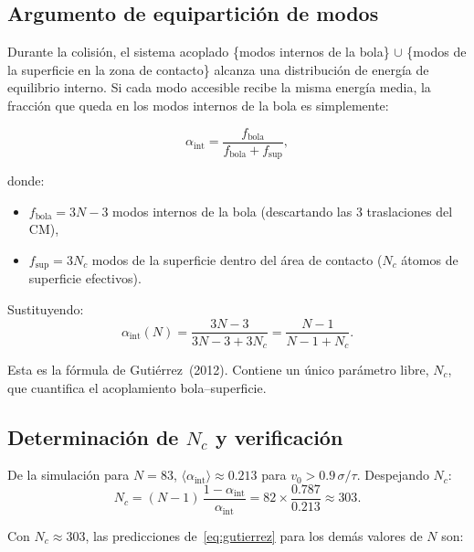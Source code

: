 \documentclass[11pt, a4paper]{article}
\begin{document}
\subsection{Argumento de equipartición de modos}

Durante la colisión, el sistema acoplado \{modos internos de la bola\} $\cup$
\{modos de la superficie en la zona de contacto\} alcanza una distribución de
energía de equilibrio interno. Si cada modo accesible recibe la misma energía
media, la fracción que queda en los modos internos de la bola es simplemente:

\begin{equation}
  \alpha_\text{int} = \frac{f_\text{bola}}{f_\text{bola} + f_\text{sup}},
\end{equation}

donde:
\begin{itemize}
  \item $f_\text{bola} = 3N - 3$ modos internos de la bola
        (descartando las 3 traslaciones del CM),
  \item $f_\text{sup} = 3N_c$ modos de la superficie dentro del área de contacto
        ($N_c$ átomos de superficie efectivos).
\end{itemize}

Sustituyendo:
\begin{equation}
  \boxed{\alpha_\text{int}(N) = \frac{3N - 3}{3N - 3 + 3N_c}
  = \frac{N - 1}{N - 1 + N_c}.}
  \label{eq:gutierrez}
\end{equation}

Esta es la fórmula de Gutiérrez~(2012). Contiene un único parámetro libre,
$N_c$, que cuantifica el acoplamiento bola--superficie.

\subsection{Determinación de \texorpdfstring{$N_c$}{Nc} y verificación}

De la simulación para $N=83$, $\langle\alpha_\text{int}\rangle \approx 0.213$
para $v_0 > 0.9\,\sigma/\tau$. Despejando $N_c$:
\begin{equation}
  N_c = (N-1)\,\frac{1 - \alpha_\text{int}}{\alpha_\text{int}}
      = 82 \times \frac{0.787}{0.213} \approx 303.
\end{equation}

Con $N_c \approx 303$, las predicciones de~\eqref{eq:gutierrez} para
los demás valores de $N$ son:
\end{document}
